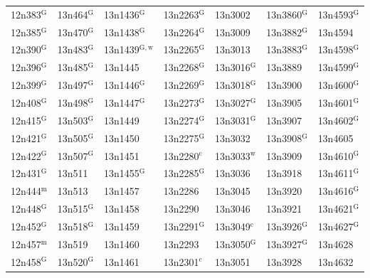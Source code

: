 \documentclass[12pt, oneside]{amsart}
\begin{document}
{\begin{longtable}{*{7}{>{\raggedright\arraybackslash}p{}}}
12n383$^{\mathrm{G}}$ & 13n464$^{\mathrm{G}}$ & 13n1436$^{\mathrm{G}}$ & 13n2263$^{\mathrm{G}}$ & 13n3002 & 13n3860$^{\mathrm{G}}$ & 13n4593$^{\mathrm{G}}$ \\
12n385$^{\mathrm{G}}$ & 13n470$^{\mathrm{G}}$ & 13n1438$^{\mathrm{G}}$ & 13n2264$^{\mathrm{G}}$ & 13n3009 & 13n3882$^{\mathrm{G}}$ & 13n4594 \\
12n390$^{\mathrm{G}}$ & 13n483$^{\mathrm{G}}$ & 13n1439$^{\mathrm{G,w}}$ & 13n2265$^{\mathrm{G}}$ & 13n3013 & 13n3883$^{\mathrm{G}}$ & 13n4598$^{\mathrm{G}}$ \\
12n396$^{\mathrm{G}}$ & 13n485$^{\mathrm{G}}$ & 13n1445 & 13n2268$^{\mathrm{G}}$ & 13n3016$^{\mathrm{G}}$ & 13n3889 & 13n4599$^{\mathrm{G}}$ \\
12n399$^{\mathrm{G}}$ & 13n497$^{\mathrm{G}}$ & 13n1446$^{\mathrm{G}}$ & 13n2269$^{\mathrm{G}}$ & 13n3018$^{\mathrm{G}}$ & 13n3900 & 13n4600$^{\mathrm{G}}$ \\
12n408$^{\mathrm{G}}$ & 13n498$^{\mathrm{G}}$ & 13n1447$^{\mathrm{G}}$ & 13n2273$^{\mathrm{G}}$ & 13n3027$^{\mathrm{G}}$ & 13n3905 & 13n4601$^{\mathrm{G}}$ \\
12n415$^{\mathrm{G}}$ & 13n503$^{\mathrm{G}}$ & 13n1449 & 13n2274$^{\mathrm{G}}$ & 13n3031$^{\mathrm{G}}$ & 13n3907 & 13n4602$^{\mathrm{G}}$ \\
12n421$^{\mathrm{G}}$ & 13n505$^{\mathrm{G}}$ & 13n1450 & 13n2275$^{\mathrm{G}}$ & 13n3032 & 13n3908$^{\mathrm{G}}$ & 13n4605 \\
12n422$^{\mathrm{G}}$ & 13n507$^{\mathrm{G}}$ & 13n1451 & 13n2280$^{\mathrm{c}}$ & 13n3033$^{\mathrm{w}}$ & 13n3909 & 13n4610$^{\mathrm{G}}$ \\
12n431$^{\mathrm{G}}$ & 13n511 & 13n1455$^{\mathrm{G}}$ & 13n2285$^{\mathrm{G}}$ & 13n3036 & 13n3918 & 13n4611$^{\mathrm{G}}$ \\
12n444$^{\mathrm{m}}$ & 13n513 & 13n1457 & 13n2286 & 13n3045 & 13n3920 & 13n4616$^{\mathrm{G}}$ \\
12n448$^{\mathrm{G}}$ & 13n515$^{\mathrm{G}}$ & 13n1458 & 13n2290 & 13n3046 & 13n3921 & 13n4621$^{\mathrm{G}}$ \\
12n452$^{\mathrm{G}}$ & 13n518$^{\mathrm{G}}$ & 13n1459 & 13n2291$^{\mathrm{G}}$ & 13n3049$^{\mathrm{c}}$ & 13n3926$^{\mathrm{G}}$ & 13n4627$^{\mathrm{G}}$ \\
12n457$^{\mathrm{m}}$ & 13n519 & 13n1460 & 13n2293 & 13n3050$^{\mathrm{G}}$ & 13n3927$^{\mathrm{G}}$ & 13n4628 \\
12n458$^{\mathrm{G}}$ & 13n520$^{\mathrm{G}}$ & 13n1461 & 13n2301$^{\mathrm{c}}$ & 13n3051 & 13n3928 & 13n4632 \\

\end{longtable}}
\end{document}
